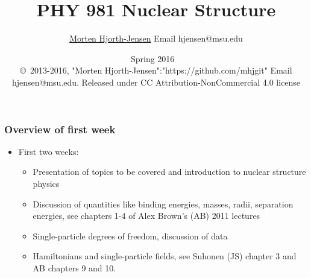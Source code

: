 \documentclass{beamer}
\begin{document}







\title{PHY 981 Nuclear Structure}


\author{\href{{https://github.com/mhjgit}}{Morten Hjorth-Jensen}  Email hjensen@msu.edu}

\date{Spring 2016 
\ \\ 
{\tiny \copyright\ 2013-2016, "Morten Hjorth-Jensen":"https://github.com/mhjgit"  Email hjensen@msu.edu. Released under CC Attribution-NonCommercial 4.0 license}
}

\begin{frame}
\titlepage
\end{frame}

\begin{frame}
\frametitle{Overview of first week}

\begin{block}{}

\begin{itemize}
\item First two weeks:
\begin{itemize}

 \item Presentation of topics to be covered and introduction to nuclear structure physics

 \item Discussion of quantities like binding energies, masses, radii, separation energies, see chapters 1-4 of Alex Brown's (AB) 2011 lectures

 \item Single-particle degrees of freedom, discussion of data

 \item Hamiltonians and single-particle fields, see  Suhonen (JS) chapter 3  and AB chapters 9 and 10.
\end{itemize}

\noindent
\end{itemize}

\noindent
\end{block}
\end{frame}
\end{document}
